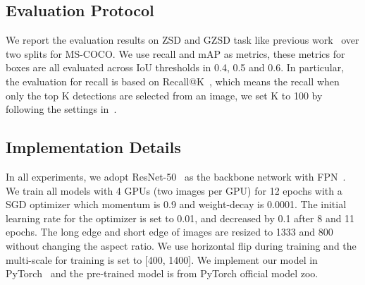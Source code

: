 \documentclass[runningheads]{llncs}
\begin{document}
\subsection{Evaluation Protocol}
We report the evaluation results on ZSD and GZSD task like previous work~\cite{bansal2018zero,rahman2020improved} over two splits for MS-COCO. We use recall and mAP as metrics, these metrics for boxes are all evaluated across IoU thresholds in 0.4, 0.5 and 0.6. In particular, the evaluation for recall is based on Recall@K~\cite{bansal2018zero}, which means the recall when only the top K detections are selected from an image, we set K to 100 by following the settings in~\cite{bansal2018zero}.
\subsection{Implementation Details}
In all experiments, we adopt ResNet-50~\cite{he2016deep} as the backbone network with FPN~\cite{lin2017feature}. We train all models with 4 GPUs (two images per GPU) for 12 epochs with a SGD optimizer which momentum is 0.9 and weight-decay is 0.0001. The initial learning rate for the optimizer is set to 0.01, and decreased by 0.1 after 8 and 11 epochs. The long edge and short edge of images are resized to 1333 and 800 without changing the aspect ratio. We use horizontal flip during training and the multi-scale for training is set to [400, 1400]. We implement our model in PyTorch~\cite{paszke2017automatic} and the pre-trained model is from PyTorch official model zoo.
\setlength{\tabcolsep}{6pt}
\end{document}

